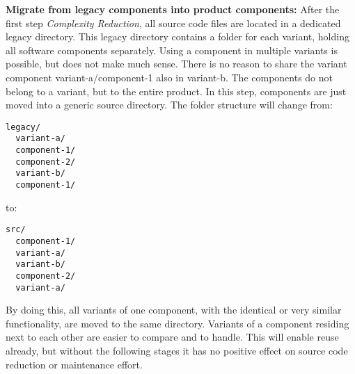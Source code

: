 \textbf{Migrate from legacy components into product components:} After the first step
\textit{Complexity Reduction}, all source code files are located in a dedicated
legacy directory. This legacy directory contains a folder for each variant,
holding all software components separately. Using a component in multiple
variants is possible, but does not make much sense. There is no reason to share
the variant component variant-a/component-1 also in variant-b. The components do
not belong to a variant, but to the entire product. In this step, components are
just moved into a generic source directory. The folder structure will change
from:
\begin{Verbatim}[frame=single,samepage=true]
  legacy/
  variant-a/
  component-1/
  component-2/
  variant-b/
  component-1/
\end{Verbatim}
to:
\begin{Verbatim}[frame=single,samepage=true]
  src/
  component-1/
  variant-a/
  variant-b/
  component-2/
  variant-a/
\end{Verbatim}
By doing this, all variants of one component, with the identical or very similar
functionality, are moved to the same directory. Variants of a component residing
next to each other are easier to compare and to handle. This will enable reuse
already, but without the following stages it has no positive effect on source
code reduction or maintenance effort.

